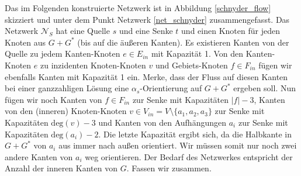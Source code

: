 Das im Folgenden konstruierte Netzwerk ist in Abbildung \ref{schnyder_flow} skizziert und unter dem Punkt Netzwerk \ref{net_schnyder} zusammengefasst. Das Netzwerk $\mathcal{N}_S$ hat eine Quelle $s$ und eine Senke $t$ und einen Knoten für jeden Knoten aus $G+G^*$ (bis auf die äußeren Kanten). Es existieren Kanten von der Quelle zu jedem Kanten-Knoten $e \in E_{in}$ mit Kapazität 1. Von den Kanten-Knoten $e$ zu inzidenten Knoten-Knoten $v$ und Gebiets-Knoten $f \in F_{in}$ fügen wir ebenfalls Kanten mit Kapazität 1 ein. Merke, dass der Fluss auf diesen Kanten bei einer ganzzahligen Lösung eine $\alpha_s$-Orientierung auf $G+G^*$ ergeben soll. Nun fügen wir noch Kanten von $f \in F_{in}$ zur Senke mit Kapazitäten $|f|-3$, Kanten von den (inneren) Knoten-Knoten $v \in V_{in} = V \setminus \{a_1,a_2,a_3\}$ zur Senke mit Kapazitäten $\text{deg}(v)-3$ und Kanten von den Aufhängungen $a_i$ zur Senke mit Kapazitäten $\text{deg}(a_i)-2$. Die letzte Kapazität ergibt sich, da die Halbkante in $G+G^*$ von $a_i$ aus immer nach außen orientiert. Wir müssen somit nur noch zwei andere Kanten von $a_i$ weg orientieren. Der Bedarf des Netzwerkes entspricht der Anzahl der inneren Kanten von $G$. Fassen wir zusammen.

